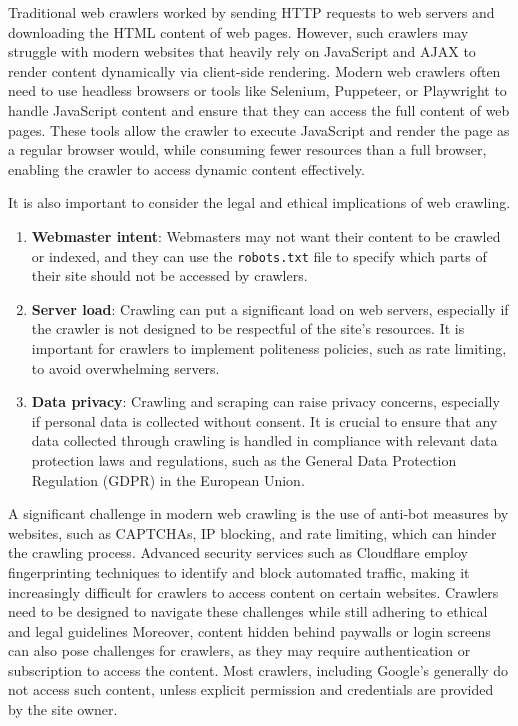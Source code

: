 Traditional web crawlers worked by sending HTTP requests to web servers and downloading the HTML content of web pages.
However, such crawlers may struggle with modern websites that heavily rely on JavaScript and AJAX to render content dynamically via client-side rendering\cite{295567}.
Modern web crawlers often need to use headless browsers or tools like Selenium, Puppeteer, or Playwright to handle JavaScript content and ensure that they can access the full content of web pages\cite{mesbah2012crawling}.
These tools allow the crawler to execute JavaScript and render the page as a regular browser would, while consuming fewer resources than a full browser, enabling the crawler to access dynamic content effectively.

It is also important to consider the legal and ethical implications of web crawling.
\begin{enumerate}
    \item \textbf{Webmaster intent}: Webmasters may not want their content to be crawled or indexed, and they can use the \texttt{robots.txt} file to specify which parts of their site should not be accessed by crawlers\cite{chang2022survey}.

    \item \textbf{Server load}: Crawling can put a significant load on web servers, especially if the crawler is not designed to be respectful of the site's resources.
    It is important for crawlers to implement politeness policies, such as rate limiting, to avoid overwhelming servers\cite{kumar2017survey}.

    \item \textbf{Data privacy}: Crawling and scraping can raise privacy concerns, especially if personal data is collected without consent.
    It is crucial to ensure that any data collected through crawling is handled in compliance with relevant data protection laws and regulations, such as the General Data Protection Regulation (GDPR) in the European Union\cite{khder2021web}.
\end{enumerate}

A significant challenge in modern web crawling is the use of anti-bot measures by websites, such as CAPTCHAs, IP blocking, and rate limiting, which can hinder the crawling process\cite{Kothari_2026}.
Advanced security services such as Cloudflare employ fingerprinting techniques to identify and block automated traffic, making it increasingly difficult for crawlers to access content on certain websites\cite{cloudflare_2026}.
Crawlers need to be designed to navigate these challenges while still adhering to ethical and legal guidelines
Moreover, content hidden behind paywalls or login screens can also pose challenges for crawlers, as they may require authentication or subscription to access the content.
Most crawlers, including Google's\cite{google_2026} generally do not access such content, unless explicit permission and credentials are provided by the site owner.

